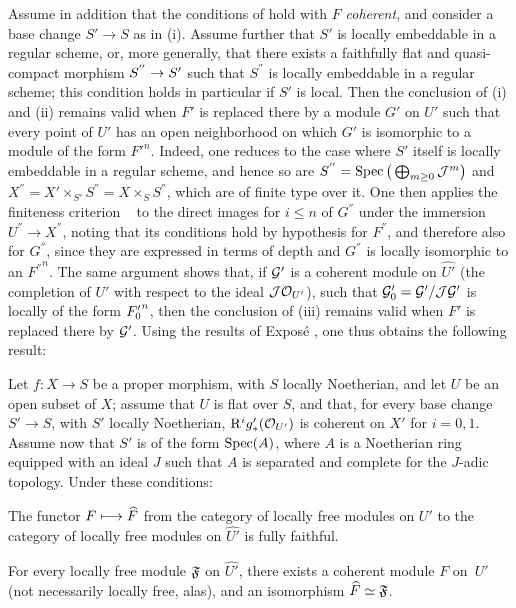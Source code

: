 \begin{remarque} \label{XII.5.9}
Assume in addition that the conditions of  hold with $F$ \emph{coherent}, and consider a base change $S'\to S$ as in  (i). Assume further that $S'$ is locally embeddable in a regular scheme, or, more generally, that there exists a faithfully flat and quasi-compact morphism $S^{''}\to \sisi{S}{S'}$ such that $S^{''}$ is locally embeddable in a regular scheme; this condition holds in particular if $S'$ is local. Then the conclusion of  (i) and (ii) remains valid when $F'$ is replaced there by a module $G'$ on $U'$ such that every point of $U'$ has an open neighborhood on which $G'$ is isomorphic to a module of the form ${F'}^n$. Indeed, one reduces to the case where $S'$ itself is locally embeddable in a regular scheme, and hence so are $S^{''}=\Spec\big(\sisi{\coprod}{\bigoplus}_{m\geq 0}\Jj^m\big)$ and $X^{''}=X'\times_{S'}S^{''}=X\times_SS^{''}$, which are of finite type over it. One then applies the finiteness criterion ~ to the direct images for $i\leq n$ of $G^{''}$ under the immersion $U^{''}\to X^{''}$, noting that its conditions hold by hypothesis for $F^{''}$\pageoriginaled, and therefore also for $G^{''}$, since they are expressed in terms of depth and $G^{''}$ is locally isomorphic to an ${F^{''}}^n$. The same argument shows that, if $\Gg'$ is a coherent module on $\widehat{U'}$ (the completion of $U'$ with respect to the ideal $\Jj\Oo_{U'}$), such that $\Gg'_0=\Gg'/\Jj\Gg'$ is locally of the form $\sisi{F_0^{'n}}{{F'_0}^n}$, then the conclusion of (iii) remains valid when $F'$ is replaced there by $\Gg'$. Using the results of Expos\'e , one thus obtains the following result:
\end{remarque}

\begin{corollaire} \label{XII.5.10}
Let $f:X\to S$ be a proper morphism, with $S$ locally Noetherian, and let $U$ be an open subset of $X$; assume that $U$ is flat over $S$, and that, for every base change $S'\to S$, with $S'$ locally Noetherian, $\sisi{R^i}{\R^i}g'_\ast(\Oo_{U'})$ is coherent on $X'$ for $i=0,1$. Assume now that $S'$ is of the form $\Spec(A)$, where $A$ is a Noetherian ring equipped with an ideal $J$ such that $A$ is separated and complete for the $J$-adic topology. Under these conditions:
\begin{enumeratei}
\item
The functor $F\mto\widehat{F}$ from the category of locally free modules on $U'$ to the category of locally free modules on $\widehat{U'}$ is fully faithful.
\item
For every locally free module $\formelF$ on $\widehat{U'}$, there exists a coherent module $F$ on~$U'$ (not necessarily locally free, alas), and an isomorphism $\widehat{F}\simeq\formelF$.
\end{enumeratei}
\end{corollaire}

